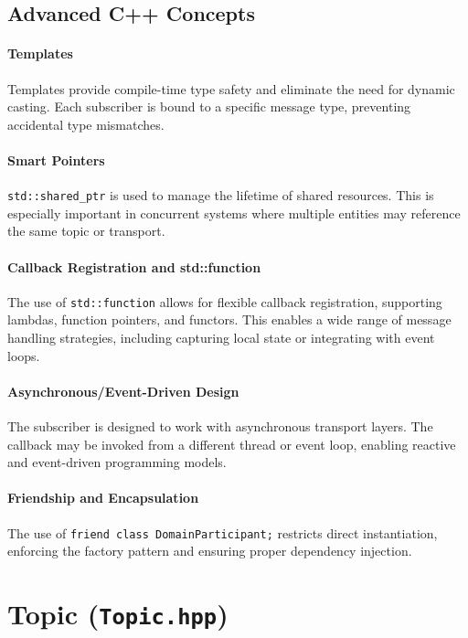 \documentclass[12pt]{report}
\begin{document}
\subsection{Advanced C++ Concepts}
\paragraph{Templates}
Templates provide compile-time type safety and eliminate the need for dynamic casting. Each subscriber is bound to a specific message type, preventing accidental type mismatches.

\paragraph{Smart Pointers}
\texttt{std::shared\_ptr} is used to manage the lifetime of shared resources. This is especially important in concurrent systems where multiple entities may reference the same topic or transport.

\paragraph{Callback Registration and std::function}
The use of \texttt{std::function} allows for flexible callback registration, supporting lambdas, function pointers, and functors. This enables a wide range of message handling strategies, including capturing local state or integrating with event loops.

\paragraph{Asynchronous/Event-Driven Design}
The subscriber is designed to work with asynchronous transport layers. The callback may be invoked from a different thread or event loop, enabling reactive and event-driven programming models.

\paragraph{Friendship and Encapsulation}
The use of \texttt{friend class DomainParticipant;} restricts direct instantiation, enforcing the factory pattern and ensuring proper dependency injection.

\section{Topic (\texttt{Topic.hpp})}
\end{document}
